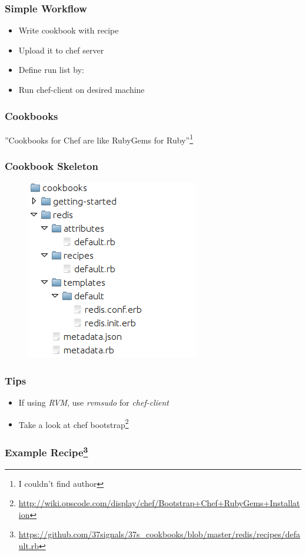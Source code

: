 \documentclass[16pt]{beamer}
\begin{document}
\begin{frame}
  \frametitle{Simple Workflow}
  \begin{itemize}
    \item Write cookbook with recipe
    \item Upload it to chef server
    \item Define run list by:
    \item Run chef-client on desired machine
  \end{itemize}
\end{frame}

\begin{frame}
  \frametitle{Cookbooks}
  \begin{center}
    \LARGE ''Cookbooks for Chef are like RubyGems for Ruby''\footnote{I couldn't find author}
  \end{center}
\end{frame}

\begin{frame}
  \frametitle{Cookbook Skeleton}
  \begin{figure}
    \includegraphics[width=0.6\linewidth]{images/cookbook-skeleton}
  \end{figure}
\end{frame}

\begin{frame}
  \frametitle{Tips}
  \begin{itemize}
    \item If using \emph{RVM}, use \emph{rvmsudo} for \emph{chef-client}
    \item Take a look at chef bootstrap\footnote{\url{http://wiki.opscode.com/display/chef/Bootstrap+Chef+RubyGems+Installation}}
  \end{itemize}
\end{frame}

\begin{frame}
  \frametitle{Example Recipe\footnote{\url{https://github.com/37signals/37s_cookbooks/blob/master/redis/recipes/default.rb}}}
  
  \label{redis_recipe}
\end{frame}
\end{document}
